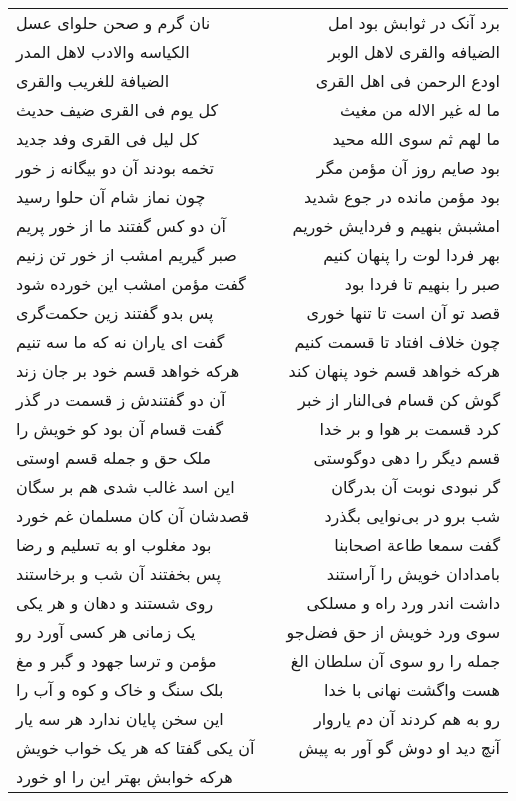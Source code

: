 \begin{center}
\begin{longtable}{l p{0.5cm} r}
نان گرم و صحن حلوای عسل
&&
برد آنک در ثوابش بود امل
\\
الکیاسه والادب لاهل المدر
&&
الضیافه والقری لاهل الوبر
\\
الضیافة للغریب والقری
&&
اودع الرحمن فی اهل القری
\\
کل یوم فی القری ضیف حدیث
&&
ما له غیر الاله من مغیث
\\
کل لیل فی القری وفد جدید
&&
ما لهم ثم سوی الله محید
\\
تخمه بودند آن دو بیگانه ز خور
&&
بود صایم روز آن مؤمن مگر
\\
چون نماز شام آن حلوا رسید
&&
بود مؤمن مانده در جوع شدید
\\
آن دو کس گفتند ما از خور پریم
&&
امشبش بنهیم و فردایش خوریم
\\
صبر گیریم امشب از خور تن زنیم
&&
بهر فردا لوت را پنهان کنیم
\\
گفت مؤمن امشب این خورده شود
&&
صبر را بنهیم تا فردا بود
\\
پس بدو گفتند زین حکمت‌گری
&&
قصد تو آن است تا تنها خوری
\\
گفت ای یاران نه که ما سه تنیم
&&
چون خلاف افتاد تا قسمت کنیم
\\
هرکه خواهد قسم خود بر جان زند
&&
هرکه خواهد قسم خود پنهان کند
\\
آن دو گفتندش ز قسمت در گذر
&&
گوش کن قسام فی‌النار از خبر
\\
گفت قسام آن بود کو خویش را
&&
کرد قسمت بر هوا و بر خدا
\\
ملک حق و جمله قسم اوستی
&&
قسم دیگر را دهی دوگوستی
\\
این اسد غالب شدی هم بر سگان
&&
گر نبودی نوبت آن بدرگان
\\
قصدشان آن کان مسلمان غم خورد
&&
شب برو در بی‌نوایی بگذرد
\\
بود مغلوب او به تسلیم و رضا
&&
گفت سمعا طاعة اصحابنا
\\
پس بخفتند آن شب و برخاستند
&&
بامدادان خویش را آراستند
\\
روی شستند و دهان و هر یکی
&&
داشت اندر ورد راه و مسلکی
\\
یک زمانی هر کسی آورد رو
&&
سوی ورد خویش از حق فضل‌جو
\\
مؤمن و ترسا جهود و گبر و مغ
&&
جمله را رو سوی آن سلطان الغ
\\
بلک سنگ و خاک و کوه و آب را
&&
هست واگشت نهانی با خدا
\\
این سخن پایان ندارد هر سه یار
&&
رو به هم کردند آن دم یاروار
\\
آن یکی گفتا که هر یک خواب خویش
&&
آنچ دید او دوش گو آور به پیش
\\
هرکه خوابش بهتر این را او خورد

\end{longtable}
\end{center}
